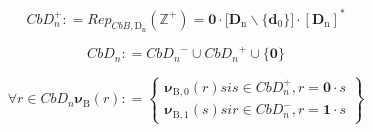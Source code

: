 \documentclass[
]{article}
\begin{document}
\begin{enumerate}
\begin{enumerate}
\begin{enumerate}
      \[\mathit{CbD}_{n}^{+}{: =}\mathit{Rep}_{\mathit{CbB},\mathbf{\mathrm{D}}_{\mathbf{\mathrm{n}}}}{(\mathbb{Z}^{\mathbf{\mathrm{+}}})}{=}{{\mathbf{0} \cdot {\lbrack{\mathbf{D}_{\mathbf{\mathrm{n}}} \smallsetminus {\{\mathbf{d}_{\mathbf{\mathrm{0}}}\}}}\rbrack}} \cdot \left\lbrack \mathbf{D}_{\mathbf{\mathrm{n}}} \right\rbrack^{\mathbf{\mathrm{\ast}}}}\]

      \[\mathit{CbD}_{n}{: =}{{{\mathit{CbD}_{n}}^{-} \cup {\mathit{CbD}_{n}}^{+}} \cup {\{\mathbf{0}\}}}\]

      \[\forall{\mathit{r} \in \mathit{CbD}_{n}}\mathbf{\nu}_{\mathbf{\mathrm{Β}}}{(\mathit{r})}{: =}\begin{Bmatrix}
      {\mathbf{\nu}_{\mathbf{\mathrm{Β,0}}}{(\mathit{r})}\mathit{si}{\mathit{s} \in \mathit{CbD}_{n}^{+}},{r = {\mathbf{0} \cdot s}}} \\
      {\mathbf{\nu}_{\mathbf{\mathrm{Β,1}}}{(\mathit{s})}\mathit{si}{\mathit{r} \in \mathit{CbD}_{n}^{-}},{r = {\mathbf{1} \cdot s}}}
      \end{Bmatrix}\]


\end{enumerate}
\end{enumerate}
\end{enumerate}
\end{document}
